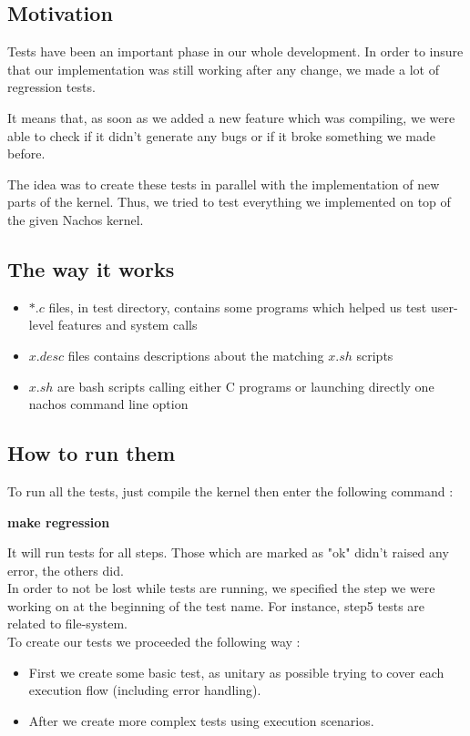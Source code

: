 \subsection{Motivation}
Tests have been an important phase in our whole development. In order to insure
that our implementation was still working after any change, we made a lot of
regression tests. 

It means that, as soon as we added a new feature which was compiling, we were
able to check if it didn't generate any bugs or if it broke something we made before.

The idea was to create these tests in parallel with the implementation of new
parts of the kernel. Thus, we tried to test everything we implemented on top of
the given Nachos kernel.

\subsection{The way it works}
\begin{itemize}
    \item $*.c$ files, in test directory, contains some programs which helped us
        test user-level features and system calls
    \item $x.desc$ files contains descriptions about the matching $x.sh$ scripts
    \item $x.sh$ are bash scripts calling either C programs or launching directly
        one nachos command line option
\end{itemize}


\subsection{How to run them}
To run all the tests, just compile the kernel then enter the following command :

\textbf{make regression}

It will run tests for all steps. Those which are marked as "ok" didn't raised
any error, the others did.\\

In order to not be lost while tests are running, we specified the step we were
working on at the beginning of the test name. For instance, step5 tests are
related to file-system.\\

To create our tests we proceeded the following way :
\begin{itemize}
    \item First we create some basic test, as unitary as possible trying to
        cover each execution flow (including error handling). 
    \item After we create more complex tests using execution scenarios.
\end{itemize}

